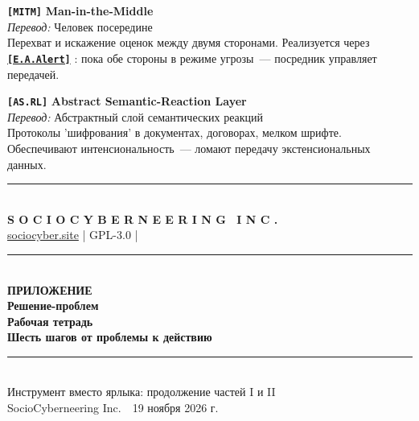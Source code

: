 \documentclass[13pt,a4paper]{article}
\newcommand{\termr}[1]{%
  \hyperref[glossary:#1]{\textbf{\texttt{\textcolor{sce-blue}{[#1]}}}}%
}
\newcommand{\termdef}[1]{\phantomsection\label{glossary:#1}}
\newcommand{\kav}[1]{\textcolor{sce-red}{'#1'}}
\begin{document}
\vspace{0.5em}
\termdef{MITM}
\noindent\textbf{\texttt{[MITM]}} \quad \textbf{Man-in-the-Middle}\\
\textit{Перевод:} Человек посередине\\
Перехват и искажение оценок между двумя сторонами. Реализуется через \termr{E.A.Alert}: пока обе стороны в режиме угрозы~--- посредник управляет передачей.

\vspace{0.5em}
\termdef{AS.RL}
\noindent\textbf{\texttt{[AS.RL]}} \quad \textbf{Abstract Semantic-Reaction Layer}\\
\textit{Перевод:} Абстрактный слой семантических реакций\\
Протоколы \kav{шифрования} в документах, договорах, мелком шрифте. Обеспечивают интенсиональность~--- ломают передачу экстенсиональных данных.

\vspace{3em}
\begin{center}
\textcolor{sce-gold}{\rule{0.5\textwidth}{0.4pt}}\\[0.6em]
{\montserrat\bfseries\small{}\color{sce-black}
S O C I O C Y B E R N E E R I N G \ I N C .}\\[0.2em]
{\footnotesize\color{sce-grey}
\href{https://sociocyber.site}{sociocyber.site} \quad|\quad
GPL-3.0 \quad|}
\end{center}

\newpage
{}
{}
\thispagestyle{empty}
\begin{center}
\vspace*{5cm}
\textcolor{sce-gold}{\rule{0.5\textwidth}{0.6pt}}\\[1.2em]
{\montserrat\large\bfseries{}\color{sce-black}ПРИЛОЖЕНИЕ}\\[1.2em]
{\montserrat\fontsize{24}{30}\selectfont\bfseries\color{sce-black}Решение-проблем\\Рабочая тетрадь}\\[1.2em]
{\montserrat\normalsize\bfseries\color{sce-grey}Шесть шагов от проблемы к действию}\\[1.4em]
\textcolor{sce-gold}{\rule{0.5\textwidth}{0.6pt}}\\[1.4em]
{\small\color{sce-black}Инструмент вместо ярлыка: продолжение частей I и II\\
SocioCyberneering Inc.\ \textbullet\ 19 ноября 2026 г.}
\end{center}

\end{document}
